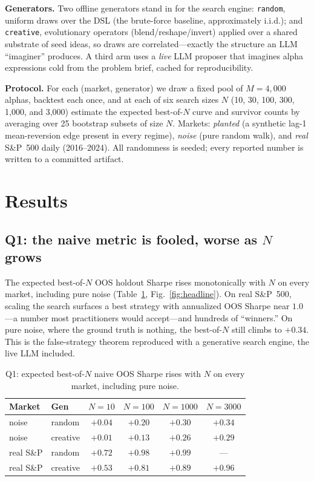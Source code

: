 \documentclass[sigconf]{acmart}
\begin{document}
\textbf{Generators.} Two offline generators stand in for the search engine: \texttt{random}, uniform draws over the DSL (the brute-force baseline, approximately i.i.d.); and \texttt{creative}, evolutionary operators (blend/reshape/invert) applied over a shared substrate of seed ideas, so draws are correlated---exactly the structure an LLM ``imaginer'' produces. A third arm uses a \emph{live} LLM proposer that imagines alpha expressions cold from the problem brief, cached for reproducibility.

\textbf{Protocol.} For each (market, generator) we draw a fixed pool of $M{=}4{,}000$ alphas, backtest each once, and at each of six search sizes $N$ (10, 30, 100, 300, 1{,}000, and 3{,}000) estimate the expected best-of-$N$ curve and survivor counts by averaging over 25 bootstrap subsets of size $N$. Markets: \emph{planted} (a synthetic lag-1 mean-reversion edge present in every regime), \emph{noise} (pure random walk), and \emph{real} S\&P~500 daily (2016--2024). All randomness is seeded; every reported number is written to a committed artifact.

\section{Results}
\subsection{Q1: the naive metric is fooled, worse as $N$ grows}
The expected best-of-$N$ OOS holdout Sharpe rises monotonically with $N$ on every market, including pure noise (Table~\ref{tab:q1}, Fig.~\ref{fig:headline}). On real S\&P~500, scaling the search surfaces a best strategy with annualized OOS Sharpe near $1.0$---a number most practitioners would accept---and hundreds of ``winners.'' On pure noise, where the ground truth is nothing, the best-of-$N$ still climbs to $+0.34$. This is the false-strategy theorem reproduced with a generative search engine, the live LLM included.

\begin{table}[t]
\caption{Q1: expected best-of-$N$ naive OOS Sharpe rises with $N$ on every market, including pure noise.}
\label{tab:q1}
\small
\begin{tabular}{@{}llcccc@{}}
\toprule
Market & Gen & $N{=}10$ & $N{=}100$ & $N{=}1000$ & $N{=}3000$ \\
\midrule
noise & random & $+0.04$ & $+0.20$ & $+0.30$ & $+0.34$ \\
noise & creative & $+0.01$ & $+0.13$ & $+0.26$ & $+0.29$ \\
real S\&P & random & $+0.72$ & $+0.98$ & $+0.99$ & --- \\
real S\&P & creative & $+0.53$ & $+0.81$ & $+0.89$ & $+0.96$ \\
\bottomrule
\end{tabular}
\end{table}
\end{document}
